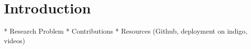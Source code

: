 \section{Introduction}

	* Research Problem
	* Contributions
	* Resources (Github, deployment on indigo, videos)